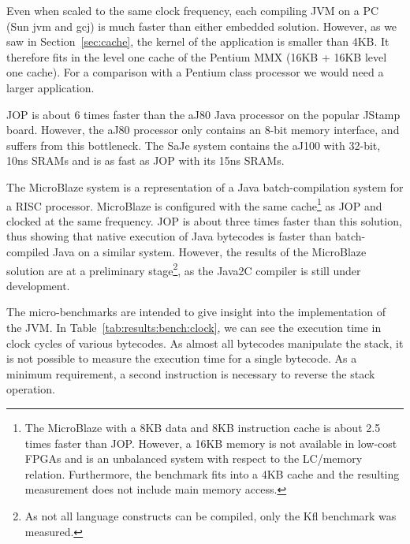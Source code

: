Even when scaled to the same clock frequency, each compiling JVM on
a PC (Sun jvm and gcj) is much faster than either embedded solution.
However, as we saw in Section~\ref{sec:cache}, the kernel of the
application is smaller than 4KB. It therefore fits in the level one
cache of the Pentium MMX (16KB + 16KB level one cache). For a
comparison with a Pentium class processor we would need a larger
application.

JOP is about 6 times faster than the aJ80 Java processor on the
popular JStamp board. However, the aJ80 processor only contains an
8-bit memory interface, and suffers from this bottleneck. The SaJe
system contains the aJ100 with 32-bit, 10ns SRAMs and is as fast as
JOP with its 15ns SRAMs.

The MicroBlaze system is a representation of a Java
batch-compilation system for a RISC processor. MicroBlaze is
configured with the same cache\footnote{The MicroBlaze with a 8KB
data and 8KB instruction cache is about 2.5 times faster than JOP.
However, a 16KB memory is not available in low-cost FPGAs and is an
unbalanced system with respect to the LC/memory relation.
Furthermore, the benchmark fits into a 4KB cache and the resulting
measurement does not include main memory access.} as JOP and clocked
at the same frequency. JOP is about three times faster than this
solution, thus showing that native execution of Java bytecodes is
faster than batch-compiled Java on a similar system. However, the
results of the MicroBlaze solution are at a preliminary
stage\footnote{As not all language constructs can be compiled, only
the Kfl benchmark was measured.}, as the Java2C compiler
\cite{Java2C} is still under development.

The micro-benchmarks are intended to give insight into the
implementation of the JVM. In Table~\ref{tab:results:bench:clock},
we can see the execution time in clock cycles of various bytecodes.
As almost all bytecodes manipulate the stack, it is not possible to
measure the execution time for a single bytecode. As a minimum
requirement, a second instruction is necessary to reverse the stack
operation.

